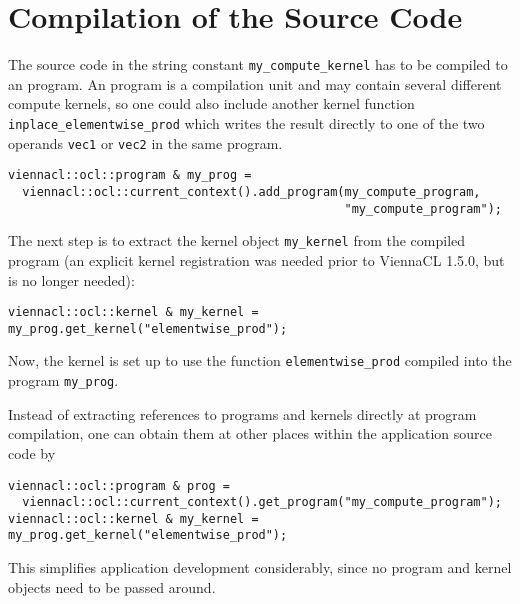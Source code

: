 \section{Compilation of the {\OpenCL} Source Code}
The source code in the string constant \lstinline{my_compute_kernel} has to be compiled to an {\OpenCL} program.
An {\OpenCL} program is a compilation unit and may contain several different compute kernels,
so one could also include another kernel function \lstinline{inplace_elementwise_prod} which writes the result directly to one of the two operands \lstinline{vec1} or \lstinline{vec2} in the same program.
\begin{lstlisting}
viennacl::ocl::program & my_prog =
  viennacl::ocl::current_context().add_program(my_compute_program,
                                               "my_compute_program");
\end{lstlisting}
The next step is to extract the kernel object \lstinline|my_kernel| from the compiled program (an explicit kernel registration was needed prior to ViennaCL 1.5.0, but is no longer needed):
\begin{lstlisting}
viennacl::ocl::kernel & my_kernel = my_prog.get_kernel("elementwise_prod");
\end{lstlisting}
Now, the kernel is set up to use the function \lstinline|elementwise_prod| compiled into the program \lstinline|my_prog|.


Instead of extracting references to programs and kernels directly at program compilation, one can obtain them at other places within the application source code by
\begin{lstlisting}
viennacl::ocl::program & prog =
  viennacl::ocl::current_context().get_program("my_compute_program");
viennacl::ocl::kernel & my_kernel = my_prog.get_kernel("elementwise_prod");
\end{lstlisting}
This simplifies application development considerably, since no program and kernel objects need to be passed around.

